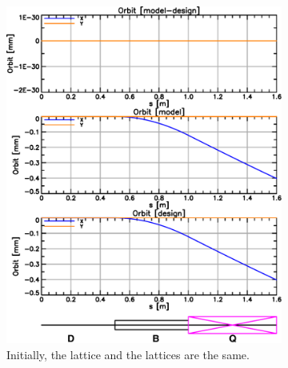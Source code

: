 \documentclass{hitec}     %
\begin{document}
{{{{\begin{figure}[tb]
  \centering
  \begin{subfigure}[t]{0.48\textwidth}
    \includegraphics[width=\textwidth]{figures/model-equal-design.pdf}
    \caption{Initially, the  lattice and the  lattices are the same.}
    \label{f:model.eq.design}
  \end{subfigure}
  \hfil
  \begin{subfigure}[t]{0.48\textwidth}

\end{subfigure}
\end{figure}}}}}
\end{document}
